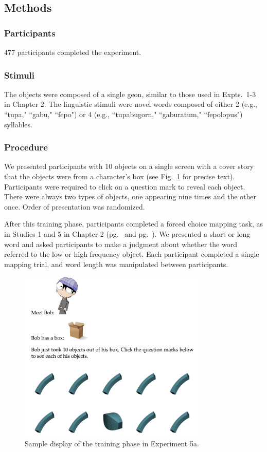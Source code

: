 \subsection{Methods}
\subsubsection{Participants} 
477 participants completed the experiment.
\subsubsection{Stimuli} 
The objects were composed of a single geon, similar to those used in Expts.\ 1-3 in Chapter 2. The linguistic stimuli were novel words composed of either 2 (e.g., ``tupa," ``gabu," ``fepo")  or 4  (e.g., ``tupabugorn," ``gaburatum," ``fepolopus")  syllables.

\subsubsection{Procedure}
We presented participants with 10 objects on a single screen with a cover story that the objects were from a character's box (see Fig.\ \ref{fig:seqfreq_display} for precise text). Participants were required to click on a question mark to reveal each object. There were always two types of objects, one appearing nine times and the other once. Order of presentation was randomized.

After this training phase, participants completed a forced choice mapping task, as in Studies 1 and 5 in Chapter 2 (pg.\ \pageref{ch2-1} and pg.\ \pageref{ch2-5}). We presented a short or long word and asked participants to make a judgment about whether the word referred to the low or high frequency object. Each participant completed a single mapping trial, and word length was manipulated between participants.

 \begin{figure}
 \begin{center}
  \includegraphics[width=3.5in]{figs/seqfreq_display.png}
  \caption{\label{fig:seqfreq_display} Sample display of the training phase in Experiment 5a.}
 \end{center}
\end{figure}


